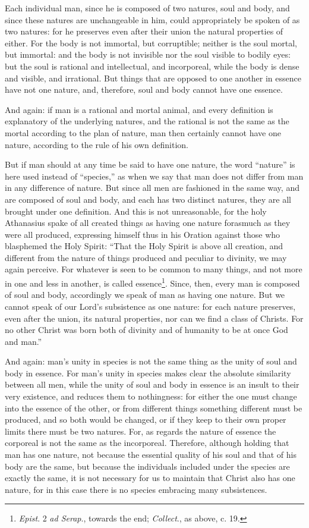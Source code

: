 Each individual man, since he is composed of two natures, soul and body, and since these natures are unchangeable in him, could appropriately be spoken of as two natures: for he preserves even after their union the natural properties of either. For the body is not immortal, but corruptible; neither is the soul mortal, but immortal: and the body is not invisible nor the soul visible to bodily eyes: but the soul is rational and intellectual, and incorporeal, while the body is dense and visible, and irrational. But things that are opposed to one another in essence have not one nature, and, therefore, soul and body cannot have one essence.

And again: if man is a rational and mortal animal, and every definition is explanatory of the underlying natures, and the rational is not the same as the mortal according to the plan of nature, man then certainly cannot have one nature, according to the rule of his own definition.

But if man should at any time be said to have one nature, the word “nature” is here used instead of “species,” as when we say that man does not differ from man in any difference of nature. But since all men are fashioned in the same way, and are composed of soul and body, and each has two distinct natures, they are all brought under one definition. And this is not unreasonable, for the holy Athanasius spake of all created things as having one nature forasmuch as they were all produced, expressing himself thus in his Oration against those who blasphemed the Holy Spirit: “That the Holy Spirit is above all creation, and different from the nature of things produced and peculiar to divinity, we may again perceive. For whatever is seen to be common to many things, and not more in one and less in another, is called essence\footnote{\emph{Epist}. 2 \emph{ad Serap}., towards the end; \emph{Collect}., as above, c. 19.}. Since, then, every man is composed of soul and body, accordingly we speak of man as having one nature. But we cannot speak of our Lord’s subsistence as one nature: for each nature preserves, even after the union, its natural properties, nor can we find a class of Christs. For no other Christ was born both of divinity and of humanity to be at once God and man.”

And again: man’s unity in species is not the same thing as the unity of soul and body in essence. For man’s unity in species makes clear the absolute similarity between all men, while the unity of soul and body in essence is an insult to their very existence, and reduces them to nothingness: for either the one must change into the essence of the other, or from different things something different must be produced, and so both would be changed, or if they keep to their own proper limits there must be two natures. For, as regards the nature of essence the corporeal is not the same as the incorporeal. Therefore, although holding that man has one nature, not because the essential quality of his soul and that of his body are the same, but because the individuals included under the species are exactly the same, it is not necessary for us to maintain that Christ also has one nature, for in this case there is no species embracing many subsistences.

